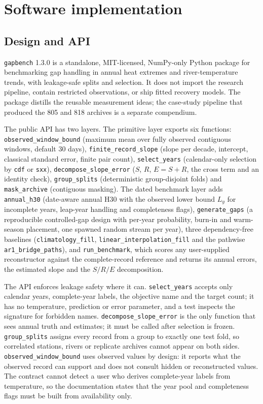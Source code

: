 \section{Software implementation}

\subsection{Design and API}

\texttt{gapbench} 1.3.0 is a standalone, MIT-licensed, NumPy-only Python package for benchmarking gap handling in annual heat extremes and river-temperature trends, with leakage-safe splits and selection. It does not import the research pipeline, contain restricted observations, or ship fitted recovery models. The package distills the reusable measurement ideas; the case-study pipeline that produced the 805 and 818 archives is a separate compendium.

The public API has two layers. The primitive layer exports six functions: \texttt{observed\_window\_bound} (maximum mean over fully observed contiguous windows, default 30 days), \texttt{finite\_record\_slope} (slope per decade, intercept, classical standard error, finite pair count), \texttt{select\_years} (calendar-only selection by \texttt{cdf} or \texttt{sxx}), \texttt{decompose\_slope\_error} ($S$, $R$, $E=S+R$, the cross term and an identity check), \texttt{group\_splits} (deterministic group-disjoint folds) and \texttt{mask\_archive} (contiguous masking). The dated benchmark layer adds \texttt{annual\_h30} (date-aware annual H30 with the observed lower bound $L_y$ for incomplete years, leap-year handling and completeness flags), \texttt{generate\_gaps} (a reproducible controlled-gap design with per-year probability, burn-in and warm-season placement, one spawned random stream per year), three dependency-free baselines (\texttt{climatology\_fill}, \texttt{linear\_interpolation\_fill} and the pathwise \texttt{ar1\_bridge\_paths}), and \texttt{run\_benchmark}, which scores any user-supplied reconstructor against the complete-record reference and returns its annual errors, the estimated slope and the $S/R/E$ decomposition.

The API enforces leakage safety where it can. \texttt{select\_years} accepts only calendar years, complete-year labels, the objective name and the target count; it has no temperature, prediction or error parameter, and a test inspects the signature for forbidden names. \texttt{decompose\_slope\_error} is the only function that sees annual truth and estimates; it must be called after selection is frozen. \texttt{group\_splits} assigns every record from a group to exactly one test fold, so correlated stations, rivers or replicate archives cannot appear on both sides. \texttt{observed\_window\_bound} uses observed values by design: it reports what the observed record can support and does not consult hidden or reconstructed values. The contract cannot detect a user who derives complete-year labels from temperature, so the documentation states that the year pool and completeness flags must be built from availability only.


